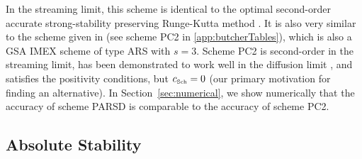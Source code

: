 In the streaming limit, this scheme is identical to the optimal second-order accurate strong-stability preserving Runge-Kutta method \cite{gottlieb_etal_2001}.  
It is also very similar to the scheme given in \cite{mcclarren_etal_2008} (see scheme PC2 in \ref{app:butcherTables}), which is also a GSA IMEX scheme of type ARS with $s=3$.  
Scheme PC2 is second-order in the streaming limit, has been demonstrated to work well in the diffusion limit \cite{mcclarren_etal_2008,radice_etal_2013}, and satisfies the positivity conditions, but $c_{\mbox{\tiny Sch}}=0$ (our primary motivation for finding an alternative).  
In Section~\ref{sec:numerical}, we show numerically that the accuracy of scheme PARSD is comparable to the accuracy of scheme PC2.  

\subsection{Absolute Stability}

